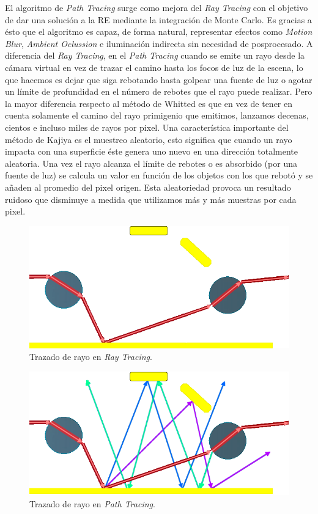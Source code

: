 \documentclass[titlepage,12pt]{report}
\begin{document}
El algoritmo de \textit{Path Tracing} surge como mejora del \textit{Ray Tracing} con el objetivo de dar una solución a la RE mediante la integración de Monte Carlo. Es gracias a ésto que el algoritmo es capaz, de forma natural, representar efectos como \textit{Motion Blur}, \textit{Ambient Oclussion} e iluminación indirecta sin necesidad de posprocesado. A diferencia del \textit{Ray Tracing}, en el \textit{Path Tracing} cuando se emite un rayo desde la cámara virtual en vez de trazar el camino hasta los focos de luz de la escena, lo que hacemos es dejar que siga rebotando hasta golpear una fuente de luz o agotar un límite de profundidad en el número de rebotes que el rayo puede realizar. Pero la mayor diferencia respecto al método de Whitted es que en vez de tener en cuenta solamente el camino del rayo primigenio que emitimos, lanzamos decenas, cientos e incluso miles de rayos por pixel. Una característica importante del método de Kajiya es el muestreo aleatorio, esto significa que cuando un rayo impacta con una superficie éste genera uno nuevo en una dirección totalmente aleatoria. Una vez el rayo alcanza el límite de rebotes o es absorbido (por una fuente de luz) se calcula un valor en función de los objetos con los que rebotó y se añaden al promedio del pixel origen. Esta aleatoriedad provoca un resultado ruidoso que disminuye a medida que utilizamos más y más muestras por cada pixel.

\begin{figure}[!ht]
	\centering
	\includegraphics[scale=0.45]{media/lightPathRT.png}
	\caption{Trazado de rayo en \textit{Ray Tracing}.}
	\label{RT_traced}
\end{figure}

\begin{figure}[!ht]
	\centering
	\includegraphics[scale=0.45]{media/lightPathPT.png}
	\caption{Trazado de rayo en \textit{Path Tracing}.}
	\label{PT_traced}
\end{figure}
\end{document}
